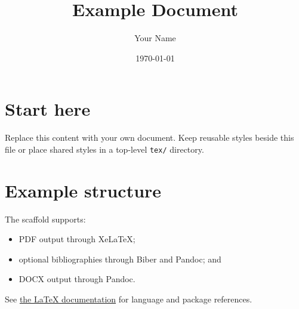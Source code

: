 \documentclass[11pt]{article}
\title{Example Document}
\author{Your Name}
\date{\today}
\begin{document}
\maketitle

\section{Start here}

Replace this content with your own document. Keep reusable styles beside this
file or place shared styles in a top-level \texttt{tex/} directory.

\section{Example structure}

The scaffold supports:

\begin{itemize}
  \item PDF output through XeLaTeX;
  \item optional bibliographies through Biber and Pandoc; and
  \item DOCX output through Pandoc.
\end{itemize}

See \href{https://www.latex-project.org/help/documentation/}{the LaTeX
documentation} for language and package references.
\end{document}
